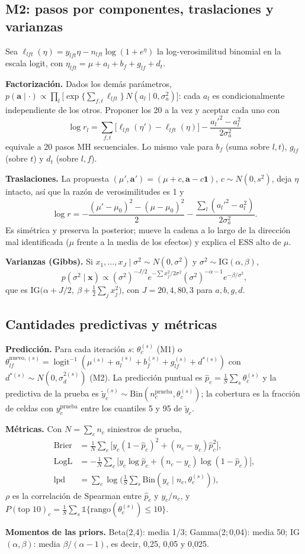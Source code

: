\documentclass[10pt,twocolumn]{article}
\newcommand{\expit}{\operatorname{logit}^{-1}}
\begin{document}
\subsection{M2: pasos por componentes, traslaciones y varianzas}\label{apx:m2}
Sea $\ell_{lft}(\eta)=y_{lft}\eta-n_{lft}\log(1+e^{\eta})$ la log-verosimilitud binomial en la escala logit, con $\eta_{lft}=\mu+a_l+b_f+g_{lf}+d_t$.

\textbf{Factorización.} Dados los demás parámetros, $p(\bm a\mid\cdot)\propto\prod_l\big[\exp\{\sum_{f,t}\ell_{lft}\}\,N(a_l\mid0,\sigma_a^2)\big]$: cada $a_l$ es condicionalmente independiente de los otros. Proponer los 20 a la vez y aceptar cada uno con
\[
\log r_l=\sum_{f,t}\big[\ell_{lft}(\eta')-\ell_{lft}(\eta)\big]-\frac{a_l'^2-a_l^2}{2\sigma_a^2}
\]
equivale a 20 pasos MH secuenciales. Lo mismo vale para $b_f$ (suma sobre $l,t$), $g_{lf}$ (sobre $t$) y $d_t$ (sobre $l,f$).

\textbf{Traslaciones.} La propuesta $(\mu',\bm a')=(\mu+c,\bm a-c\bm 1)$, $c\sim N(0,s^2)$, deja $\eta$ intacto, así que la razón de verosimilitudes es 1 y
\[
\log r=-\frac{(\mu'-\mu_0)^2-(\mu-\mu_0)^2}{2}-\frac{\sum_l(a_l'^2-a_l^2)}{2\sigma_a^2}.
\]
Es simétrica y preserva la posterior; mueve la cadena a lo largo de la dirección mal identificada ($\mu$ frente a la media de los efectos) y explica el ESS alto de $\mu$.

\textbf{Varianzas (Gibbs).} Si $x_1,\dots,x_J\mid\sigma^2\sim N(0,\sigma^2)$ y $\sigma^2\sim\mathrm{IG}(\alpha,\beta)$,
\[
p(\sigma^2\mid\bm x)\propto(\sigma^2)^{-J/2}e^{-\sum x_j^2/2\sigma^2}(\sigma^2)^{-\alpha-1}e^{-\beta/\sigma^2},
\]
que es $\mathrm{IG}\big(\alpha+J/2,\ \beta+\tfrac12\sum_jx_j^2\big)$, con $J=20,4,80,3$ para $a,b,g,d$.

\subsection{Cantidades predictivas y métricas}
\textbf{Predicción.} Para cada iteración $s$: $\theta^{(s)}_{c}$ (M1) o $\theta^{\mathrm{nuevo},(s)}_{lf}=\expit(\mu^{(s)}+a_l^{(s)}+b_f^{(s)}+g_{lf}^{(s)}+d^{*(s)})$ con $d^{*(s)}\sim N(0,\sigma_d^{2(s)})$ (M2). La predicción puntual es $\hat p_c=\frac1S\sum_s\theta^{(s)}_c$ y la predictiva de la prueba es $\tilde y_c^{(s)}\sim\mathrm{Bin}(n_c^{\mathrm{prueba}},\theta_c^{(s)})$; la cobertura es la fracción de celdas con $y_c^{\mathrm{prueba}}$ entre los cuantiles 5 y 95 de $\tilde y_c$.

\textbf{Métricas.} Con $N=\sum_cn_c$ siniestros de prueba,
\begin{align*}
\mathrm{Brier}&=\tfrac1N\textstyle\sum_c\big[y_c(1-\hat p_c)^2+(n_c-y_c)\hat p_c^2\big],\\
\mathrm{LogL}&=-\tfrac1N\textstyle\sum_c\big[y_c\log\hat p_c+(n_c-y_c)\log(1-\hat p_c)\big],\\
\mathrm{lpd}&=\textstyle\sum_c\log\Big(\tfrac1S\sum_s\mathrm{Bin}(y_c\mid n_c,\theta_c^{(s)})\Big),
\end{align*}
$\rho$ es la correlación de Spearman entre $\hat p_c$ y $y_c/n_c$, y $P(\text{top 10})_c=\frac1S\sum_s\mathbb 1\{\mathrm{rango}(\theta_c^{(s)})\le10\}$.

\textbf{Momentos de las priors.} Beta(2,4): media 1/3; Gamma(2;\,0,04): media 50; IG$(\alpha,\beta)$: media $\beta/(\alpha-1)$, es decir, 0,25, 0,05 y 0,025.
\end{document}
